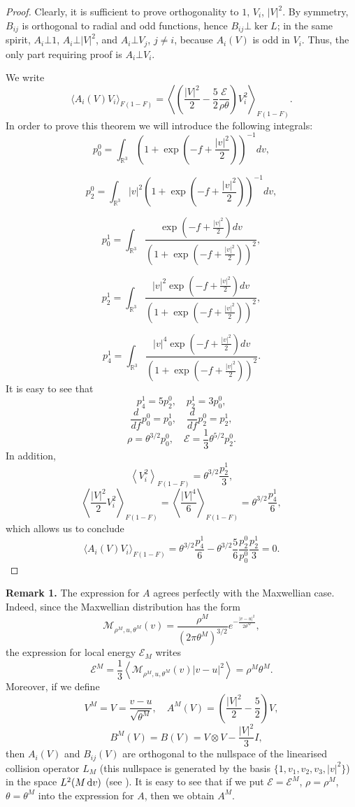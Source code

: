 \begin{proof}
Clearly, it is sufficient to prove orthogonality to $1$, $V_i$, $|V|^2$.
By symmetry, $B_{ij}$ is orthogonal to radial and odd functions, hence $B_{ij}\bot \ker L$; in the same spirit, $A_i\bot 1$, $A_i\bot |V|^2$, and $A_i\bot V_j$, $j\ne i$, because $A_i(V)$ is odd in $V_i$. Thus, the only part requiring proof is $A_i\bot V_i$.

We write
\[\langle A_i(V)V_i\rangle_{F(1-F)}=\left\langle \left(\frac{|V|^2}{2}-\frac52   \frac{\mathcal E}{\rho\theta}\right)V_i^2\right\rangle_{F(1-F)}.\]
In order to prove this theorem we will introduce the following integrals:
\[p^0_0 =\int_{\mathbb
R^3}\left(1+\exp\left(-f + \frac{|v|^2}{2}\right)\right)^{-1}dv,\]

\[p^0_2=   \int_{\mathbb
R^3}|v|^2\left(1+\exp\left(-f + \frac{|v|^2}{2}\right)\right)^{-1}dv,\]

\[p^1_0 =\int_{\mathbb R^3}\frac{\exp\left(-f + \frac{|v|^2}{2}\right)dv}
{\left(1+\exp\left(-f + \frac{|v|^2}{2}\right)\right)^2},\]

\[p^1_2 =\int_{\mathbb
R^3}\frac{|v|^2\exp\left(-f + \frac{|v|^2}{2}\right)dv}
{\left(1+\exp\left(-f + \frac{|v|^2}{2}\right)\right)^2},\]

\[p^1_4 =\int_{\mathbb
R^3}\frac{|v|^4\exp\left(-f + \frac{|v|^2}{2}\right)dv}{\left(1+\exp\left(-f +
\frac{|v|^2}{2}\right)\right)^2}.\]
It is easy to see that 
\[p^1_4 = 5p^0_2,\quad p^1_2 = 3p^0_0,\]
\[\frac{d}{df} p^0_0 =   p^1_0,\quad \frac{d}{df} p^0_2 =   p^1_2,\]
\[\rho = \theta^{3/2}p^0_0,\quad \mathcal E = \frac 13 \theta^{5/2} p^0_2.\]
In addition, \[\left\langle  V_i^2\right\rangle_{F(1-F)}=\theta^{3/2}\frac{p^1_2}{3},\]
\[\left\langle \frac{|V|^2}{2} V_i^2\right\rangle_{F(1-F)} = \left\langle \frac{|V|^4}{6}  \right\rangle_{F(1-F)}=\theta^{3/2}\frac{p^1_4}{6},\] which allows us to conclude
\[\langle A_i(V)V_i\rangle_{F(1-F)}=\theta^{3/2}   \frac{p^1_4}{6}- \theta^{3/2}\frac56   \frac{ p^0_2}{ p^0_0}\frac{p^1_2}{3}=0. \]



 

 
\end{proof}
\textbf{Remark 1.} The expression for $A$ agrees perfectly with the Maxwellian case. Indeed, since the Maxwellian distribution has the form
\[\mathcal M_{\rho^M,u,\theta^M}(v)=\frac{\rho^M}{(2\pi\theta^M)^{3/2}}e^{-\frac{|v-u|^2}{2\theta^M}},\]
the expression for local energy $\mathcal E_M$ writes
\[\mathcal E^M=\frac 13 \left\langle \mathcal M_{\rho^M,u,\theta^M}(v) |v-u|^2 \right\rangle = \rho^M\theta^M.\]
Moreover, if we define 
\[V^M=V=\frac{v-u}{\sqrt {\theta^M}},\quad A^M(V)=\left(\frac{|V|^2}{2}-\frac 52\right)V,\]\[\quad B^M(V)=B(V)=V\otimes V-\frac{|V|^2}{3}I,\]
then $A_i(V)$ and $B_{ij}(V)$ are orthogonal to the nullspace of the linearised collision operator $L_M$ (this nullspace is generated by the basis $\{1,v_1,v_2,v_3,|v|^2\}$) in the space $L^2(M{\,\mathrm{d} v})$ (see
 \cite{Bardos1991Fluid}).
It is easy to see that if we put $\mathcal E=\mathcal E^M$, $\rho=\rho^M$, $\theta=\theta^M$ into the expression for $A$, then we obtain $A^M$.


